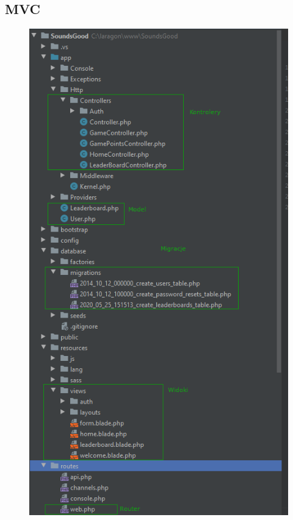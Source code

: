 \documentclass[11pt,a4paper]{article}
\begin{document}
\subsection{\textbf{MVC}}
\begin{figure} [h]
\centering
\includegraphics [keepaspectratio, scale=0.75] {1.7.png}
\end{figure}
\newpage
\end{document}
